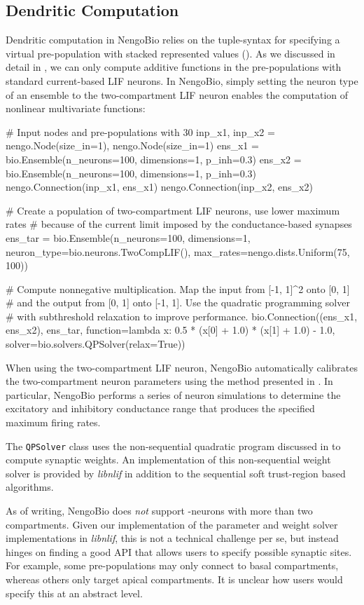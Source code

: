 \subsection{Dendritic Computation}
Dendritic computation in NengoBio relies on the tuple-syntax for specifying a virtual pre-population with stacked represented values ().
As we discussed in detail in , we can only compute additive functions in the pre-populations with standard current-based LIF neurons.
In NengoBio, simply setting the neuron type of an ensemble to the two-compartment LIF neuron enables the computation of nonlinear multivariate functions:
\begin{pythoncode}
# Input nodes and pre-populations with 30%
inp_x1, inp_x2 = nengo.Node(size_in=1), nengo.Node(size_in=1)
ens_x1 = bio.Ensemble(n_neurons=100, dimensions=1, p_inh=0.3)
ens_x2 = bio.Ensemble(n_neurons=100, dimensions=1, p_inh=0.3)
nengo.Connection(inp_x1, ens_x1)
nengo.Connection(inp_x2, ens_x2)

# Create a population of two-compartment LIF neurons, use lower maximum rates
# because of the current limit imposed by the conductance-based synapses
ens_tar = bio.Ensemble(n_neurons=100, dimensions=1,
                       neuron_type=bio.neurons.TwoCompLIF(),
                       max_rates=nengo.dists.Uniform(75, 100))

# Compute nonnegative multiplication. Map the input from [-1, 1]^2 onto [0, 1]
# and the output from [0, 1] onto [-1, 1]. Use the quadratic programming solver
# with subthreshold relaxation to improve performance.
bio.Connection((ens_x1, ens_x2), ens_tar,
               function=lambda x: 0.5 * (x[0] + 1.0) * (x[1] + 1.0) - 1.0,
               solver=bio.solvers.QPSolver(relax=True))
\end{pythoncode}
When using the two-compartment LIF neuron, NengoBio automatically calibrates the two-compartment neuron parameters using the method presented in .
In particular, NengoBio performs a series of neuron simulations to determine the excitatory and inhibitory conductance range that produces the specified maximum firing rates.

The \texttt{QPSolver} class uses the non-sequential quadratic program discussed in  to compute synaptic weights.
An implementation of this non-sequential weight solver is provided by \emph{libnlif} in addition to the sequential soft trust-region based algorithms.

As of writing, NengoBio does \emph{not} support \nlif-neurons with more than two compartments.
Given our implementation of the parameter and weight solver implementations in \emph{libnlif}, this is not a technical challenge per se, but instead hinges on finding a good API that allows users to specify possible synaptic sites.
For example, some pre-populations may only connect to basal compartments, whereas others only target apical compartments.
It is unclear how users would specify this at an abstract level.
